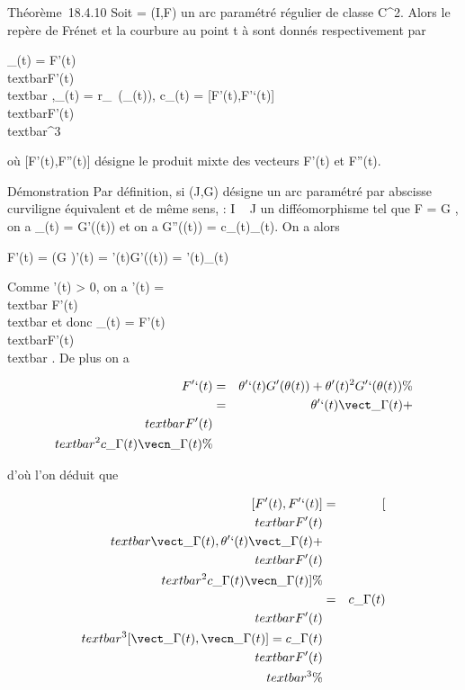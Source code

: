\documentclass[]{article}
\begin{document}
Théorème~18.4.10 Soit \Gamma = (I,F) un arc paramétré régulier de classe
C^2. Alors le repère de Frénet et la courbure au point t à \Gamma
sont donnés respectivement par

\vect\_\Gamma(t) = F'(t) \over
\\textbar{}F'(t)\\textbar{}
,\quad \vecn\_\Gamma(t) =
r\_\pi~(\vect\_\Gamma(t)),\quad
c\_\Gamma(t) = {[}F'(t),F'`(t){]} \over
\\textbar{}F'(t)\\textbar{}^3

où {[}F'(t),F''(t){]} désigne le produit mixte des vecteurs F'(t) et
F''(t).

Démonstration Par définition, si (J,G) désigne un arc paramétré par
abscisse curviligne équivalent et de même sens, \theta : I \rightarrow~ J un
difféomorphisme tel que F = G \cdot \theta, on a
\vect\_\Gamma(t) = G'(\theta(t)) et on a G''(\theta(t)) =
c\_\Gamma(t)\vecn\_\Gamma(t). On a alors

F'(t) = (G \cdot \theta)'(t) = \theta'(t)G'(\theta(t)) =
\theta'(t)\vect\_\Gamma(t)

Comme \theta'(t) \textgreater{} 0, on a \theta'(t) =\\textbar{}
F'(t)\\textbar{} et donc
\vect\_\Gamma(t) = F'(t) \over
\\textbar{}F'(t)\\textbar{} . De plus on
a

\begin{align*} F'`(t)& =& \theta'`(t)G'(\theta(t)) +
\theta'(t)^2G'`(\theta(t)) \%& \\ & =&
\theta'`(t)\vect\_\Gamma(t) +\\textbar{}
F'(t)\\textbar{}^2c\_
\Gamma(t)\vecn\_\Gamma(t)\%&
\\ \end{align*}

d'où l'on déduit que

\begin{align*} {[}F'(t),F'`(t){]}& =&
{[}\\textbar{}F'(t)\\textbar{}\vect\_\Gamma(t),\theta'`(t)\vect\_\Gamma(t)
+\\textbar{}
F'(t)\\textbar{}^2c\_
\Gamma(t)\vecn\_\Gamma(t){]}\%&
\\ & =&
c\_\Gamma(t)\\textbar{}F'(t)\\textbar{}^3{[}\vect\_
\Gamma(t),\vecn\_\Gamma(t){]} =
c\_\Gamma(t)\\textbar{}F'(t)\\textbar{}^3
\%& \\ \end{align*}
\end{document}
